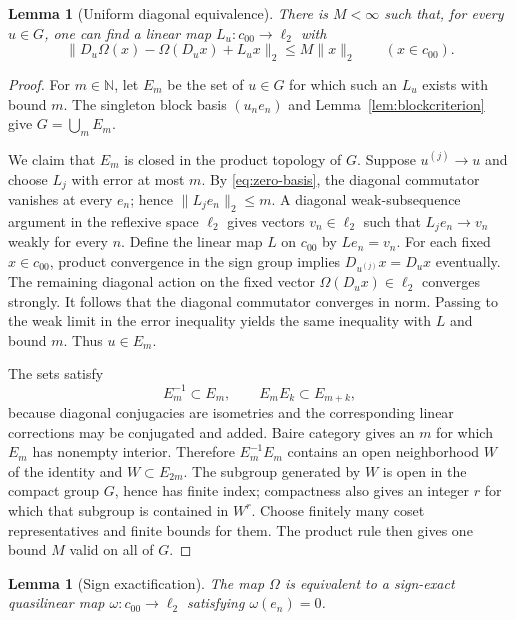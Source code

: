 \documentclass[11pt]{article}
\newtheorem{lemma}[theorem]{Lemma}
\newcommand{\czz}{c_{00}}
\newcommand{\Dop}[1]{D_{#1}}
\begin{document}
\begin{lemma}[Uniform diagonal equivalence]\label{lem:uniform-diagonal}
There is $M<\infty$ such that, for every $u\in G$, one can find a linear
map $L_u:\czz\to\ell_2$ with
\begin{equation}\label{eq:uniform-diagonal}
 \|\Dop u\Omega(x)-\Omega(\Dop u x)+L_ux\|_2
 \le M\|x\|_2 \qquad(x\in\czz).
\end{equation}
\end{lemma}

\begin{proof}
For $m\in\mathbb N$, let $E_m$ be the set of $u\in G$ for which such an
$L_u$ exists with bound $m$.  The singleton block basis $(u_ne_n)$ and
Lemma~\ref{lem:blockcriterion} give $G=\bigcup_mE_m$.

We claim that $E_m$ is closed in the product topology of $G$.  Suppose
$u^{(j)}\to u$ and choose $L_j$ with error at most $m$.  By
\eqref{eq:zero-basis}, the diagonal commutator vanishes at every $e_n$;
hence $\|L_je_n\|_2\le m$.  A diagonal weak-subsequence argument in the
reflexive space $\ell_2$ gives vectors $v_n\in\ell_2$ such that
$L_je_n\to v_n$ weakly for every $n$.  Define the linear map $L$ on $\czz$
by $Le_n=v_n$.  For each fixed $x\in\czz$, product convergence in the sign
group implies $\Dop{u^{(j)}}x=\Dop ux$ eventually.  The remaining diagonal
action on the fixed vector $\Omega(\Dop ux)\in\ell_2$ converges strongly.
It follows that the diagonal commutator converges in norm.
Passing to the weak limit in the error inequality yields the same inequality
with $L$ and bound $m$.  Thus $u\in E_m$.

The sets satisfy
\[
 E_m^{-1}\subset E_m,
 \qquad E_mE_k\subset E_{m+k},
\]
because diagonal conjugacies are isometries and the corresponding linear
corrections may be conjugated and added.  Baire category gives an $m$ for
which $E_m$ has nonempty interior.  Therefore $E_m^{-1}E_m$ contains an
open neighborhood $W$ of the identity and $W\subset E_{2m}$.  The subgroup
generated by $W$ is open in the compact group $G$, hence has finite index;
compactness also gives an integer $r$ for which that subgroup is contained
in $W^r$.  Choose finitely many coset representatives and finite bounds for
them.  The product rule then gives one bound $M$ valid on all of $G$.
\end{proof}

\begin{lemma}[Sign exactification]\label{lem:exactification}
The map $\Omega$ is equivalent to a sign-exact quasilinear map
$\omega:\czz\to\ell_2$ satisfying $\omega(e_n)=0$.
\end{lemma}
\end{document}
